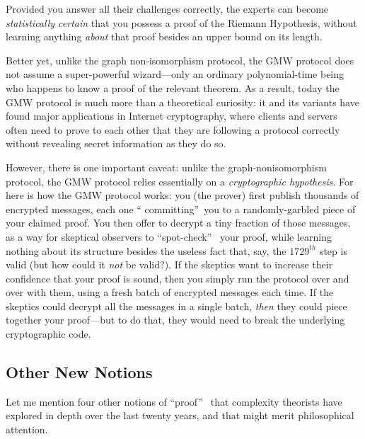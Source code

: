 \documentclass[12pt,onecolumn]{article}%
\begin{document}
Provided you answer all their challenges correctly, the experts can become
\textit{statistically certain} that you possess a proof of the Riemann
Hypothesis, without learning anything \textit{about} that proof besides an
upper bound on its length.

Better yet, unlike the graph non-isomorphism protocol, the GMW protocol does
not assume a super-powerful wizard---only an ordinary polynomial-time being
who happens to know a proof of the relevant theorem. As a result, today the
GMW protocol is much more than a theoretical curiosity: it and its variants
have found major applications in Internet cryptography, where clients and
servers often need to prove to each other that they are following a protocol
correctly without revealing secret information as they do so.

However, there is one important caveat: unlike the graph-nonisomorphism
protocol, the GMW protocol relies essentially on a \textit{cryptographic
hypothesis}. For here is how the GMW protocol works: you (the prover) first
publish thousands of encrypted messages, each one \textquotedblleft
committing\textquotedblright\  you to a randomly-garbled piece of your claimed
proof. You then offer to decrypt a tiny fraction of those messages, as a way
for skeptical observers to \textquotedblleft spot-check\textquotedblright\ %
 your proof, while learning nothing about its structure besides the useless
fact that, say, the $1729^{th}$ step is valid (but how could it \textit{not}
be valid?). If the skeptics want to increase their confidence that your
proof is sound, then you simply run the protocol over and over with them,
using a fresh batch of encrypted messages each time. If the skeptics could
decrypt all the messages in a single batch, \textit{then} they could piece
together your proof---but to do that, they would need to break the underlying
cryptographic code.

\subsection{Other New Notions\label{OTHERNEW}}

Let me mention four other notions of \textquotedblleft proof\textquotedblright\ %
 that complexity theorists have explored in depth over the last twenty years,
and that might merit philosophical attention.
\end{document}
